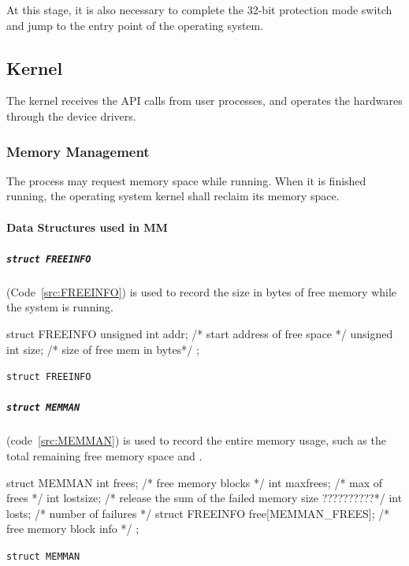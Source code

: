 \documentclass{swfcthesis}
\begin{document}
At this stage, it is also necessary to complete the 32-bit protection mode switch and jump
to the entry point of the operating system.

\subsection{Kernel}
\label{sec:kernel}

The kernel receives the API calls from user processes, and operates the
hardwares through the device drivers.

\subsubsection{Memory Management}
\label{sec:memory-management-1}


The process may request memory space while running. When it is finished running, the
operating system kernel shall reclaim its memory space. %


\paragraph{Data Structures used in MM}

\subparagraph{\texttt{struct FREEINFO}}

(Code~\ref{src:FREEINFO}) is used to record the size in bytes of free memory while the
system is running.

\begin{listing}[H]
  \begin{codeblock}
\begin{ccode}
struct FREEINFO
{ 
  unsigned int addr; /* start address of free space */
  unsigned int size; /* size of free mem in bytes*/
};
\end{ccode}
  \end{codeblock}
  \caption{\texttt{struct FREEINFO}}\label{src:FREEINFO}
\end{listing}

\subparagraph{\texttt{struct MEMMAN}} (code~\ref{src:MEMMAN}) is used to record the entire
memory usage, such as the total remaining free memory space and .

\begin{listing}[H]
  \begin{codeblock}
\begin{ccode}
struct MEMMAN
{ 
  int frees;    /* free memory blocks */
  int maxfrees; /* max of frees */
  int lostsize; /* release the sum of the failed memory size ??????????*/
  int losts;    /* number of failures */
  struct FREEINFO free[MEMMAN_FREES]; /* free memory block info */
};
\end{ccode}
  \end{codeblock}
  \caption{\texttt{struct MEMMAN}}\label{src:MEMMAN}
\end{listing}
\end{document}
